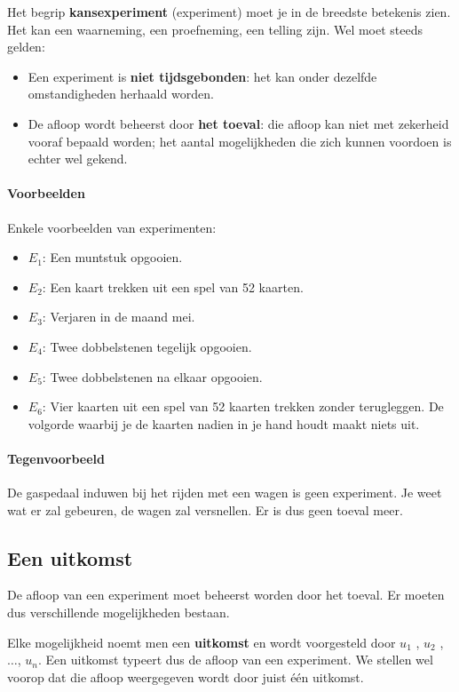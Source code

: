\documentclass[12pt,twoside]{article}
\begin{document}
Het begrip {\bf kansexperiment} (experiment) moet je in de breedste betekenis zien. Het kan een
waarneming, een proefneming, een telling zijn. Wel moet steeds gelden:
\begin{itemize}
  \item Een experiment is {\bf niet tijdsgebonden}: het kan onder dezelfde omstandigheden
herhaald worden.
  \item De afloop wordt beheerst door {\bf het toeval}: die afloop kan niet met zekerheid
vooraf bepaald worden; het aantal mogelijkheden die zich kunnen voordoen is
echter wel gekend.
\end{itemize}

\paragraph*{Voorbeelden} Enkele voorbeelden van experimenten:
\begin{itemize}
  \item $E_1$: Een muntstuk opgooien.
  \item $E_2$: Een kaart trekken uit een spel van 52 kaarten.
  \item $E_3$: Verjaren in de maand mei.
  \item $E_4$: Twee dobbelstenen tegelijk opgooien.
  \item $E_5$: Twee dobbelstenen na elkaar opgooien.
  \item $E_6$: Vier kaarten uit een spel van 52 kaarten trekken zonder terugleggen. De volgorde waarbij je de kaarten nadien in je hand houdt maakt niets uit.
\end{itemize}

\paragraph*{Tegenvoorbeeld}
De gaspedaal induwen bij het rijden met een wagen is geen experiment. Je weet wat er zal gebeuren, de wagen zal versnellen. Er is dus geen toeval meer.


\subsection{Een uitkomst}

De afloop van een experiment moet beheerst worden door het toeval. Er moeten dus verschillende mogelijkheden bestaan.

Elke mogelijkheid noemt men een {\bf uitkomst} en wordt voorgesteld door $u_1$ , $u_2$ , $\ldots$, $u_n$. Een uitkomst typeert dus de afloop van een experiment. We stellen wel voorop dat die afloop weergegeven wordt door juist één uitkomst.
\end{document}
